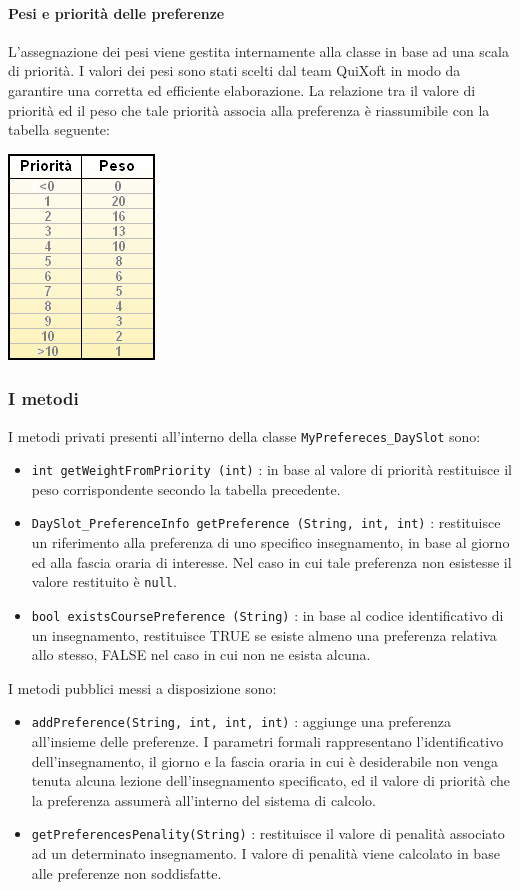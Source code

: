 \documentclass[11pt,a4paper]{article}
\begin{document}
\paragraph{Pesi e priorità delle preferenze}
L'assegnazione dei pesi viene gestita internamente alla classe in base ad una scala di priorità. I valori dei pesi sono stati scelti dal team QuiXoft in modo da garantire una corretta ed efficiente elaborazione. La relazione tra il valore di priorità ed il peso che tale priorità associa alla preferenza è riassumibile con la tabella seguente:

\begin{center}
 \includegraphics[scale=0.8]{images/Algoritm_WeightPriorityRelation.png}
\end{center}
\subsubsection*{I metodi}
I metodi privati presenti all'interno della classe \verb|MyPrefereces_DaySlot| sono:
\begin{itemize}
\item \verb|int getWeightFromPriority (int)| : in base al valore di priorità restituisce il peso corrispondente secondo la tabella precedente.
\item \verb|DaySlot_PreferenceInfo getPreference (String, int, int)| : restituisce un riferimento alla preferenza di uno specifico insegnamento, in base al giorno ed alla fascia oraria di interesse. Nel caso in cui tale preferenza non esistesse il valore restituito è \verb|null|.
\item \verb|bool existsCoursePreference (String)| : in base al codice identificativo di un insegnamento, restituisce TRUE se esiste almeno una preferenza relativa allo stesso, FALSE nel caso in cui non ne esista alcuna.
\end{itemize}

I metodi pubblici messi a disposizione sono:
\begin{itemize}
\item \verb|addPreference(String, int, int, int)| : aggiunge una preferenza all'insieme delle preferenze. I parametri formali rappresentano l'identificativo dell'insegnamento, il giorno e la fascia oraria in cui è desiderabile non venga tenuta alcuna lezione dell'insegnamento specificato, ed il valore di priorità che la preferenza assumerà all'interno del sistema di calcolo.
\item \verb|getPreferencesPenality(String)| : restituisce il valore di penalità associato ad un determinato insegnamento. I valore di penalità viene calcolato in base alle preferenze non soddisfatte.
\end{itemize}
\end{document}
